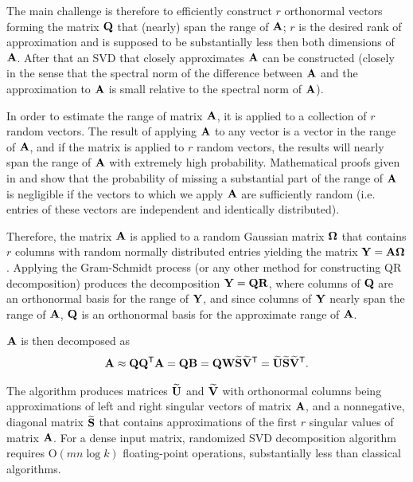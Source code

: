 The main challenge is therefore to efficiently construct $r$ orthonormal vectors forming the matrix $\mathbf{Q}$ that (nearly) span the range of $\mathbf{A}$; $r$ is the desired rank of approximation and is supposed to be substantially less then both dimensions of $\mathbf{A}$. After that an SVD that closely approximates $\mathbf{A}$ can be constructed (closely in the sense that the spectral norm of the difference between $\mathbf{A}$ and the approximation to $\mathbf{A}$ is small relative to the spectral norm of $\mathbf{A}$).

In order to estimate the range of matrix $\mathbf{A}$, it is applied to a collection of $r$ random vectors. The result of applying $\mathbf{A}$ to any vector is a vector in the range of $\mathbf{A}$, and if the matrix is applied to $r$ random vectors, the results will nearly span the range of $\mathbf{A}$ with extremely high probability. Mathematical proofs given in \cite{Halko2011} and \cite{Witten2015} show that the probability of missing a substantial part of the range of $\mathbf{A}$ is negligible if the vectors to which we apply $\mathbf{A}$ are sufficiently random (i.e. entries of these vectors are independent and identically distributed).

Therefore, the matrix $\mathbf{A}$ is applied to a random Gaussian matrix $\mathbf{\Omega}$ that contains $r$ columns with random normally distributed entries yielding the matrix $\mathbf{Y} = \mathbf{A} \mathbf{\Omega}$. Applying the Gram-Schmidt process (or any other method for constructing QR decomposition) produces the decomposition $\mathbf{Y}=\mathbf{Q}\mathbf{R}$, where columns of $\mathbf{Q}$ are an orthonormal basis for the range of $\mathbf{Y}$, and since columns of $\mathbf{Y}$ nearly span the range of $\mathbf{A}$, $\mathbf{Q}$ is an orthonormal basis for the approximate range of $\mathbf{A}$.

$\mathbf{A}$ is then decomposed as
\begin{equation}
\mathbf{A} \approx \mathbf{Q}\mathbf{Q}^{\mathsf{T}}\mathbf{A} = \mathbf{Q}\mathbf{B} = \mathbf{Q}\mathbf{W}\mathbf{\widetilde{S}}\mathbf{\widetilde{V}}^{\mathsf{T}} = \mathbf{\widetilde{U}}\mathbf{\widetilde{S}}\mathbf{\widetilde{V}}^{\mathsf{T}}.
\end{equation}

\noindent
The algorithm produces matrices $\mathbf{\widetilde{U}}$ and $\mathbf{\widetilde{V}}$ with orthonormal columns being approximations of left and right singular vectors of matrix $\mathbf{A}$, and a nonnegative, diagonal matrix $\mathbf{\widetilde{S}}$ that contains approximations of the first $r$ singular values of matrix $\mathbf{A}$. For a dense input matrix, randomized SVD decomposition algorithm requires $\mathrm{O}(mn \log{k})$ floating-point operations, substantially less than classical algorithms.

